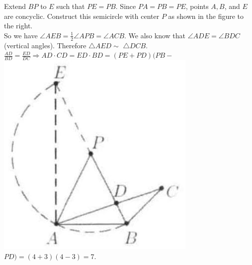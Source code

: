 \documentclass{article}
\begin{document}
Extend \(B P\) to \(E\) such that \(P E=P B\). Since \(P A=P B=P E\), points \(A, B\), and \(E\) are concyclic. Construct this semicircle with center \(P\) as shown in the figure to the right.\\
So we have \(\angle A E B=\frac{1}{2} \angle A P B=\angle A C B\). We also know that \(\angle A D E=\angle B D C\) (vertical angles). Therefore \(\triangle A E D \sim\) \(\triangle D C B\).\\
\(\frac{A D}{B D}=\frac{E D}{D C} \Rightarrow A D \cdot C D=E D \cdot B D=(P E+P D)(P B-\)\\
\includegraphics[width=\textwidth]{images/reasoning_image_1.jpg} \(P D)=(4+3)(4-3)=7\).
\end{document}
